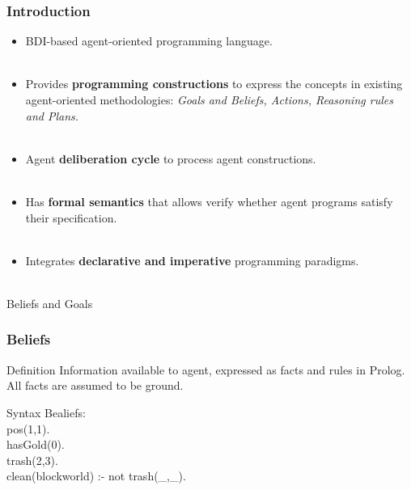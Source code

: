\documentclass{beamer}
\newcommand\tab[1][1cm]{\hspace*{#1}}
\begin{document}
\begin{frame}
\frametitle{Introduction}
  \begin{itemize}
      \item BDI-based agent-oriented programming language.\\~\\
      
      \item Provides \textbf{programming constructions} to express the concepts in existing agent-oriented methodologies: \textit{Goals and Beliefs, Actions, Reasoning rules and Plans.}\\~\\
      
      \item Agent \textbf{deliberation cycle} to process agent constructions. \\~\\

      \item Has \textbf{formal semantics} that allows verify whether agent programs satisfy their specification.\\~\\
      \item Integrates \textbf{declarative and imperative} programming paradigms.\\~\\
  \end{itemize}
\end{frame}

\begin{frame}
\Huge{\centerline{Beliefs and Goals}}
\end{frame}
\begin{frame}
\frametitle{Beliefs}
\begin{block}{Definition}
	Information available to agent, expressed as facts and rules in Prolog. All facts are assumed to be ground.
\end{block}
\begin{block}{Syntax}
  Bealiefs: \\
  \tab  pos(1,1).\\
  \tab hasGold(0).\\
  \tab trash(2,3).\\
  \tab clean(blockworld) :- not trash(\_,\_).
\end{block}
\end{frame}
\end{document}
